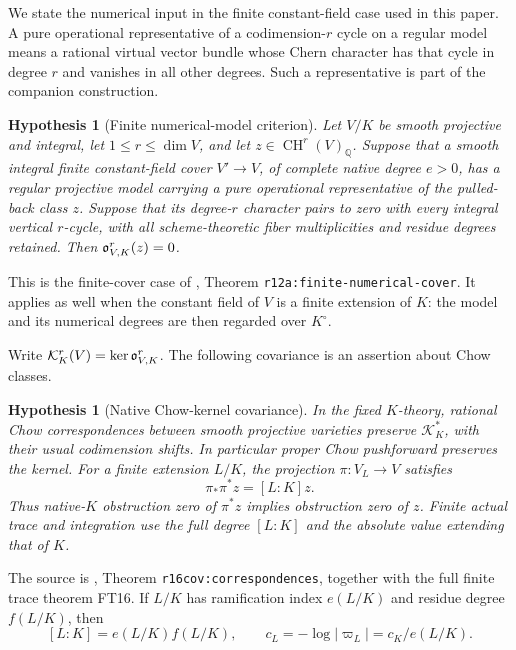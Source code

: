 \documentclass[11pt,a4paper]{article}
\newtheorem{hypothesis}[theorem]{Hypothesis}
\theoremstyle{definition}
\theoremstyle{remark}\newtheorem{remark}[theorem]{Remark}
\numberwithin{equation}{section}
\newcommand{\Q}{\mathbb Q}\newcommand{\R}{\mathbb R}\newcommand{\C}{\mathbb C}
\newcommand{\CH}{\operatorname{CH}}\newcommand{\an}{\mathrm{an}}
\begin{document}
We state the numerical input in the finite constant-field case used in
this paper. A pure operational representative of a codimension-$r$
cycle on a regular model means a rational virtual vector bundle whose
Chern character has that cycle in degree $r$ and vanishes in all other
degrees. Such a representative is part of the companion construction.

\begin{hypothesis}[Finite numerical-model criterion]\label{prop:numerical}
Let $V/K$ be smooth projective and integral, let $1\le r\le\dim V$,
and let $z\in\CH^r(V)_\Q$. Suppose that a smooth integral finite
constant-field cover $V'\to V$, of complete native degree $e>0$, has a
regular projective model carrying a pure operational representative of
the pulled-back class $z$. Suppose that its degree-$r$ character pairs
to zero with every integral vertical $r$-cycle, with all
scheme-theoretic fiber multiplicities and residue degrees retained.
Then $\mathfrak o^r_{V,K}(z)=0$.
\end{hypothesis}

This is the finite-cover case of \cite{InternalNumerical}, Theorem
\texttt{r12a:finite-numerical-cover}. It applies as well when the
constant field of $V$ is a finite extension of $K$: the model and its
numerical degrees are then regarded over $K^\circ$.

Write $\mathcal K_K^r(V)=\ker\mathfrak o^r_{V,K}$. The following covariance
is an assertion about Chow classes.

\begin{hypothesis}[Native Chow-kernel covariance]\label{prop:covariance}
In the fixed $K$-theory, rational Chow correspondences between smooth
projective varieties preserve $\mathcal K_K^*$, with their usual
codimension shifts. In particular proper Chow pushforward preserves
the kernel. For a finite extension $L/K$, the projection
$\pi:V_L\to V$ satisfies
\[
          \pi_*\pi^*z=[L:K]z.
\]
Thus native-$K$ obstruction zero of $\pi^*z$ implies obstruction zero
of $z$. Finite actual trace and integration use the full degree
$[L:K]$ and the absolute value extending that of $K$.
\end{hypothesis}

The source is \cite{InternalCovariance}, Theorem
\texttt{r16cov:correspondences}, together with the full finite trace
theorem FT16. If $L/K$ has ramification index $e(L/K)$ and residue
degree $f(L/K)$, then
\begin{equation}\label{eq:local-normalization}
 [L:K]=e(L/K)f(L/K),\qquad
 c_L=-\log|\varpi_L|=c_K/e(L/K).
\end{equation}
\end{document}
